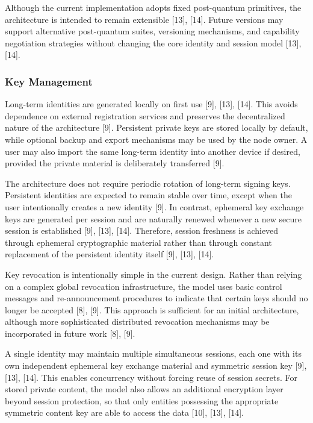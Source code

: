 \documentclass[12pt,a4paper]{article}
\begin{document}
Although the current implementation adopts fixed post-quantum primitives, the architecture is intended to remain extensible [13], [14]. Future versions may support alternative post-quantum suites, versioning mechanisms, and capability negotiation strategies without changing the core identity and session model [13], [14].

\subsubsection{Key Management}

Long-term identities are generated locally on first use [9], [13], [14]. This avoids dependence on external registration services and preserves the decentralized nature of the architecture [9]. Persistent private keys are stored locally by default, while optional backup and export mechanisms may be used by the node owner. A user may also import the same long-term identity into another device if desired, provided the private material is deliberately transferred [9].

The architecture does not require periodic rotation of long-term signing keys. Persistent identities are expected to remain stable over time, except when the user intentionally creates a new identity [9]. In contrast, ephemeral key exchange keys are generated per session and are naturally renewed whenever a new secure session is established [9], [13], [14]. Therefore, session freshness is achieved through ephemeral cryptographic material rather than through constant replacement of the persistent identity itself [9], [13], [14].

Key revocation is intentionally simple in the current design. Rather than relying on a complex global revocation infrastructure, the model uses basic control messages and re-announcement procedures to indicate that certain keys should no longer be accepted [8], [9]. This approach is sufficient for an initial architecture, although more sophisticated distributed revocation mechanisms may be incorporated in future work [8], [9].

A single identity may maintain multiple simultaneous sessions, each one with its own independent ephemeral key exchange material and symmetric session key [9], [13], [14]. This enables concurrency without forcing reuse of session secrets. For stored private content, the model also allows an additional encryption layer beyond session protection, so that only entities possessing the appropriate symmetric content key are able to access the data [10], [13], [14].
\end{document}
